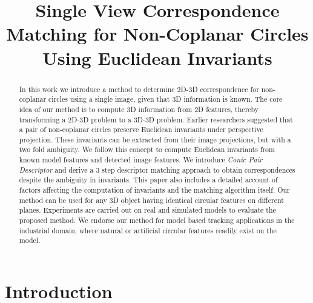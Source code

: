 \documentclass{bmvc2k}
\title{Single View Correspondence Matching for Non-Coplanar Circles Using Euclidean Invariants}
\begin{document}
\maketitle

\begin{abstract}
In this work we introduce a method to determine 2D-3D correspondence for non-coplanar circles using a single image, given that 
3D information is known. 
The core idea of our method is to compute 3D information from 2D features, thereby transforming a 2D-3D problem to a 3D-3D problem. 
Earlier researchers suggested that a pair of non-coplanar circles preserve Euclidean invariants under perspective projection. 
These invariants can be extracted from their image projections, but with a two fold ambiguity. 
We follow this concept to compute Euclidean invariants from known model features and detected image features. 
We introduce \textit{Conic Pair Descriptor} and derive a 3 step descriptor matching approach to obtain correspondences despite the ambiguity in invariants. 
This paper also includes a detailed account of factors affecting the computation of invariants and the matching algorithm itself. 
Our method can be used for any 3D object having identical circular features on different planes. 
Experiments are carried out on real and simulated models to evaluate the proposed method.
We endorse our method for model based tracking applications in the industrial domain, where natural or artificial circular features readily exist on the model. 

\end{abstract}

\section{Introduction}
\label{sec:intro}
\end{document}
